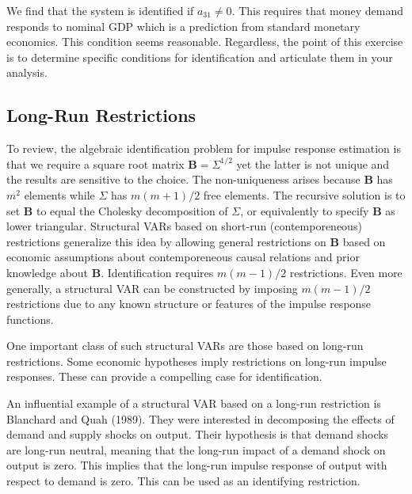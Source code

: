 \documentclass[10pt]{article}
\begin{document}
We find that the system is identified if $a_{31} \neq 0$. This requires that money demand responds to nominal GDP which is a prediction from standard monetary economics. This condition seems reasonable. Regardless, the point of this exercise is to determine specific conditions for identification and articulate them in your analysis.

\subsection{Long-Run Restrictions}
To review, the algebraic identification problem for impulse response estimation is that we require a square root matrix $\boldsymbol{B}=\Sigma^{1 / 2}$ yet the latter is not unique and the results are sensitive to the choice. The non-uniqueness arises because $\boldsymbol{B}$ has $m^{2}$ elements while $\Sigma$ has $m(m+1) / 2$ free elements. The recursive solution is to set $\boldsymbol{B}$ to equal the Cholesky decomposition of $\Sigma$, or equivalently to specify $\boldsymbol{B}$ as lower triangular. Structural VARs based on short-run (contemporeneous) restrictions generalize this idea by allowing general restrictions on $\boldsymbol{B}$ based on economic assumptions about contemporeneous causal relations and prior knowledge about $\boldsymbol{B}$. Identification requires $m(m-1) / 2$ restrictions. Even more generally, a structural VAR can be constructed by imposing $m(m-1) / 2$ restrictions due to any known structure or features of the impulse response functions.

One important class of such structural VARs are those based on long-run restrictions. Some economic hypotheses imply restrictions on long-run impulse responses. These can provide a compelling case for identification.

An influential example of a structural VAR based on a long-run restriction is Blanchard and Quah (1989). They were interested in decomposing the effects of demand and supply shocks on output. Their hypothesis is that demand shocks are long-run neutral, meaning that the long-run impact of a demand shock on output is zero. This implies that the long-run impulse response of output with respect to demand is zero. This can be used as an identifying restriction.
\end{document}

